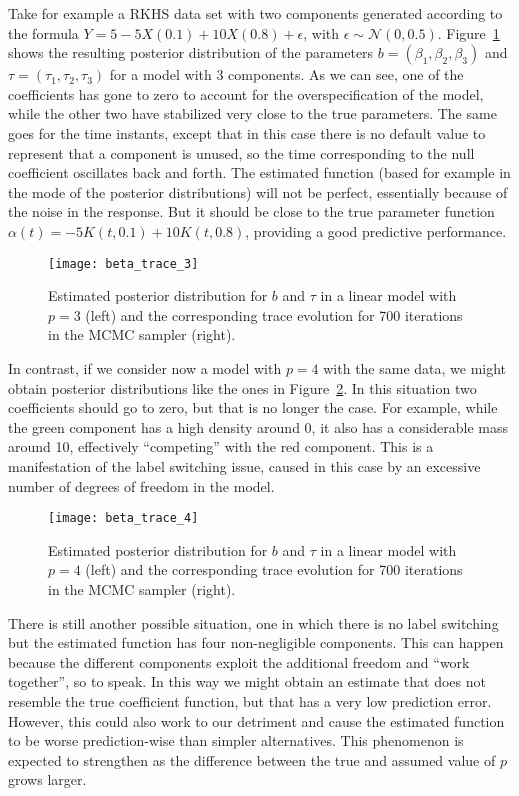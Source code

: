 Take for example a RKHS data set with two components generated according to the formula \(Y=5 -5X(0.1) + 10X(0.8) + \epsilon\), with \(\epsilon\sim \mathcal N(0, 0.5)\). Figure~\ref{fig:beta_trace_3} shows the resulting posterior distribution of the parameters \(b=(\beta_1, \beta_2, \beta_3)\) and \(\tau=(\tau_1, \tau_2, \tau_3)\) for a model with 3 components. As we can see, one of the coefficients has gone to zero to account for the overspecification of the model, while the other two have stabilized very close to the true parameters. The same goes for the time instants, except that in this case there is no default value to represent that a component is unused, so the time corresponding to the null coefficient oscillates back and forth. The estimated function (based for example in the mode of the posterior distributions) will not be perfect, essentially because of the noise in the response. But it should be close to the true parameter function \(\alpha(t)=-5K(t, 0.1) + 10K(t, 0.8)\), providing a good predictive performance.

\begin{figure}[ht!]
  \centering
  \texttt{[image: beta\_trace\_3]}
  \caption{Estimated posterior distribution for \(b\) and \(\tau\) in a linear model with \(p=3\) (left) and the corresponding trace evolution for 700 iterations in the MCMC sampler (right).}\label{fig:beta_trace_3}
\end{figure}

In contrast, if we consider now a model with \(p=4\) with the same data, we might obtain posterior distributions like the ones in Figure~\ref{fig:beta_trace_4}. In this situation two coefficients should go to zero, but that is no longer the case. For example, while the green component has a high density around 0, it also has a considerable mass around 10, effectively ``competing'' with the red component. This is a manifestation of the label switching issue, caused in this case by an excessive number of degrees of freedom in the model.

\begin{figure}[ht!]
  \centering
  \texttt{[image: beta\_trace\_4]}
  \caption{Estimated posterior distribution for \(b\) and \(\tau\) in a linear model with \(p=4\) (left) and the corresponding trace evolution for 700 iterations in the MCMC sampler (right).}\label{fig:beta_trace_4}
\end{figure}

There is still another possible situation, one in which there is no label switching but the estimated function has four non-negligible components. This can happen because the different components exploit the additional freedom and ``work together'', so to speak. In this way we might obtain an estimate that does not resemble the true coefficient function, but that has a very low prediction error. However, this could also work to our detriment and cause the estimated function to be worse prediction-wise than simpler alternatives. This phenomenon is expected to strengthen as the difference between the true and assumed value of \(p\) grows larger.

